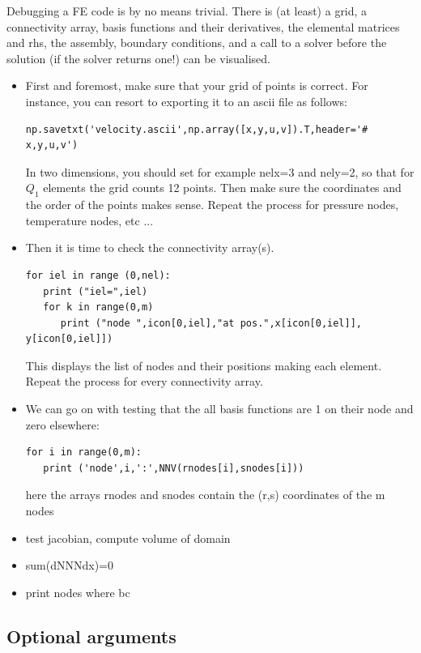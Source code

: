 Debugging a FE code is by no means trivial. There is (at least) a grid, a connectivity array, basis functions and their derivatives, the elemental matrices and rhs, the assembly, boundary conditions, and a call to a solver before the solution (if the solver returns one!) can be visualised. 
\begin{itemize}
\item First and foremost, make sure that your grid of points is correct.
For instance, you can resort to exporting it to an ascii file as follows:
\begin{lstlisting}
np.savetxt('velocity.ascii',np.array([x,y,u,v]).T,header='# x,y,u,v')
\end{lstlisting}
In two dimensions, you should set for example nelx=3 and nely=2, so that 
for $Q_1$ elements the grid counts 12 points. Then make sure the coordinates and the order of the points makes sense. 
Repeat the process for pressure nodes, temperature nodes, etc ...

\item Then it is time to check the connectivity array(s). 
\begin{lstlisting}
for iel in range (0,nel):
   print ("iel=",iel)
   for k in range(0,m)
      print ("node ",icon[0,iel],"at pos.",x[icon[0,iel]], y[icon[0,iel]])
\end{lstlisting}
This displays the list of nodes and their positions making each element.
Repeat the process for every connectivity array.

\item We can go on with testing that the all basis functions are 1 on their node and  zero elsewhere:
\begin{lstlisting}
for i in range(0,m):
   print ('node',i,':',NNV(rnodes[i],snodes[i]))
\end{lstlisting}
here the arrays rnodes and snodes contain the (r,s) coordinates of the m nodes 

\item test jacobian, compute volume of domain

\item sum(dNNNdx)=0

\item print nodes where bc 

\end{itemize}

\subsection{Optional arguments}

